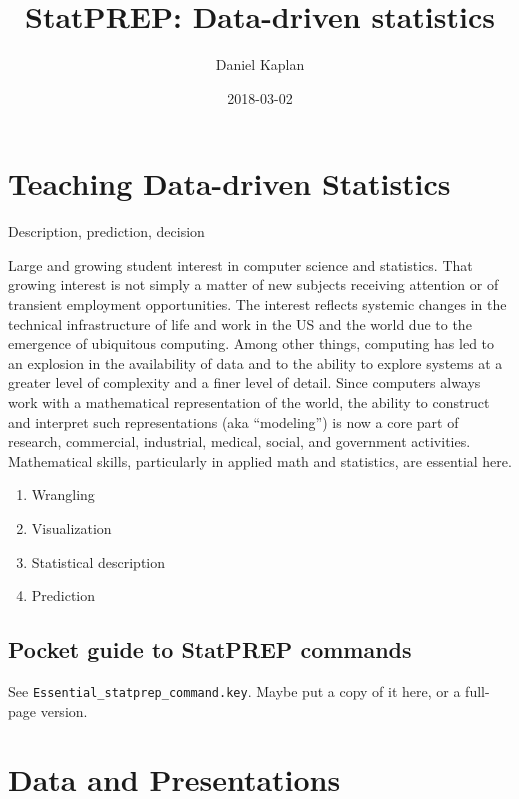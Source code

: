 \documentclass[]{book}
\title{StatPREP: Data-driven statistics}
\author{Daniel Kaplan}
\date{2018-03-02}
\providecommand{\tightlist}{%
  \setlength{\itemsep}{0pt}\setlength{\parskip}{0pt}}
\theoremstyle{definition}
\theoremstyle{definition}
\theoremstyle{definition}
\theoremstyle{remark}
\begin{document}
\maketitle

{
\setcounter{tocdepth}{1}
\tableofcontents
}
\chapter{Teaching Data-driven Statistics}\label{intro}

Description, prediction, decision

Large and growing student interest in computer science and statistics.
That growing interest is not simply a matter of new subjects receiving
attention or of transient employment opportunities. The interest
reflects systemic changes in the technical infrastructure of life and
work in the US and the world due to the emergence of ubiquitous
computing. Among other things, computing has led to an explosion in the
availability of data and to the ability to explore systems at a greater
level of complexity and a finer level of detail. Since computers always
work with a mathematical representation of the world, the ability to
construct and interpret such representations (aka ``modeling'') is now a
core part of research, commercial, industrial, medical, social, and
government activities. Mathematical skills, particularly in applied math
and statistics, are essential here.

\begin{enumerate}
\def\labelenumi{\arabic{enumi}.}
\tightlist
\item
  Wrangling
\item
  Visualization
\item
  Statistical description
\item
  Prediction
\end{enumerate}

\section{Pocket guide to StatPREP
commands}\label{pocket-guide-to-statprep-commands}

See \texttt{Essential\_statprep\_command.key}. Maybe put a copy of it
here, or a full-page version.

\chapter{Data and Presentations}\label{data-and-presentations}
\end{document}
